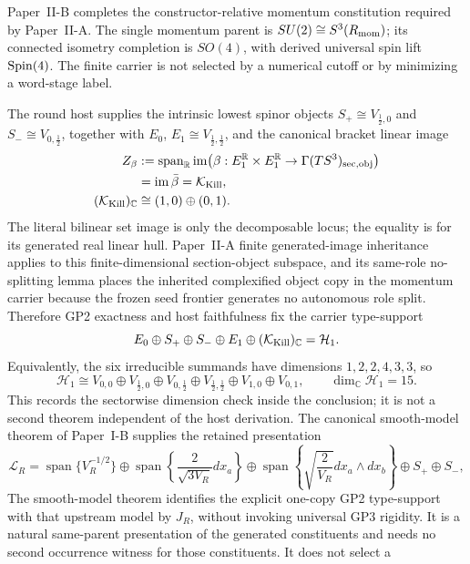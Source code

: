 \documentclass[12pt,a4paper]{article}
\begin{document}
Paper~II-B completes the constructor-relative momentum constitution required by
Paper~II-A.  The single momentum parent is
\(SU(2)\cong S^3(R_{\mathrm{mom}})\); its connected isometry completion is \(SO(4)\),
with derived universal spin lift \(\mathrm{Spin}(4)\).  The finite carrier is not
selected by a numerical cutoff or by minimizing a word-stage label.

The round host supplies the intrinsic lowest spinor objects
\(S_+\cong V_{\frac12,0}\) and \(S_-\cong V_{0,\frac12}\), together with
\(E_0\), \(E_1\cong V_{\frac12,\frac12}\), and the canonical bracket linear image
\[
 \begin{aligned}
  Z_\beta
  &:=\operatorname{span}_{\mathbb R}\operatorname{im}
  \bigl(\beta:E_1^{\mathbb R}\times E_1^{\mathbb R}
      \to\Gamma(TS^3)_{\rm sec,obj}\bigr)\\
  &=\operatorname{im}\bar\beta=\mathcal K_{\rm Kill},\\
  (\mathcal K_{\rm Kill})_{\mathbb C}
  &\cong(1,0)\oplus(0,1).
 \end{aligned}
\]
The literal bilinear set image is only the decomposable locus; the equality is
for its generated real linear hull.  Paper~II-A finite generated-image
inheritance applies to this finite-dimensional section-object subspace, and
its same-role no-splitting lemma places the inherited complexified object copy
in the momentum carrier because the frozen seed frontier generates no
autonomous role split.
Therefore GP2 exactness and host faithfulness fix the carrier type-support
\[
 E_0\oplus S_+\oplus S_-\oplus E_1
 \oplus(\mathcal K_{\rm Kill})_{\mathbb C}
 =\mathcal H_1.
\]
Equivalently, the six irreducible summands have dimensions
\(1,2,2,4,3,3\), so
\[
 \mathcal H_1\cong
 V_{0,0}\oplus V_{\frac12,0}\oplus V_{0,\frac12}
 \oplus V_{\frac12,\frac12}\oplus V_{1,0}\oplus V_{0,1},
 \qquad
 \dim_{\mathbb C}\mathcal H_1=15.
\]
This records the sectorwise dimension check inside the conclusion; it is not
a second theorem independent of the host derivation.
The canonical smooth-model theorem of Paper~I-B supplies the retained
presentation
\[
 \mathcal L_R
 =\operatorname{span}\{V_R^{-1/2}\}
 \oplus\operatorname{span}\!\left\{
   \frac{2}{\sqrt{3V_R}}dx_a\right\}
 \oplus\operatorname{span}\!\left\{
   \sqrt{\frac2{V_R}}dx_a\wedge dx_b\right\}
 \oplus S_+\oplus S_-,
\]
The smooth-model theorem identifies the explicit one-copy GP2 type-support
with that upstream model by \(J_R\), without invoking universal GP3
rigidity.  It is a natural same-parent presentation of the generated
constituents and needs no second occurrence witness for those constituents.  It does not select a
\end{document}
